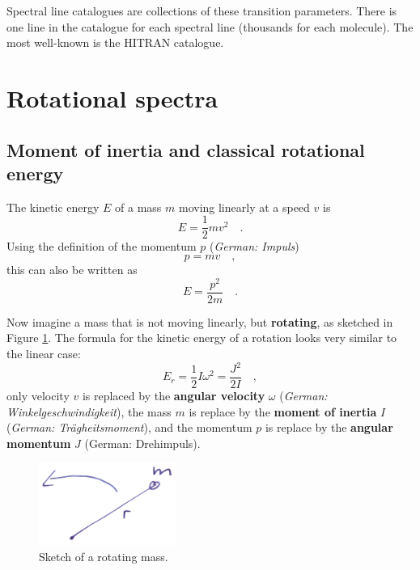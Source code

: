 Spectral line catalogues are collections of these transition parameters. There
is one line in the catalogue for each spectral line (thousands for each
molecule). The most well-known is the HITRAN catalogue.


\section{Rotational spectra}
\label{sec:rotational_spectra}

\subsection{Moment of inertia and classical rotational energy}

The kinetic energy $E$ of a mass $m$ moving linearly at a speed $v$ is
\begin{equation}
  E = \frac{1}{2} m v^2 \quad .
\end{equation}
Using the definition of the momentum $p$ (\emph{German: Impuls})
\begin{equation}
  p = m v \quad ,
\end{equation}
this can also be written as
\begin{equation}
  E = \frac{p^2}{2m} \quad .
\end{equation}

Now imagine a mass that is not moving linearly, but \textbf{rotating},
as sketched in Figure \ref{fig:rotating_mass}. The formula for the
kinetic energy of a rotation looks very similar to the linear case:
\begin{equation}
  \label{eq:rotational_energy}
  E_r = \frac{1}{2} I \omega^2 = \frac{J^2}{2I} \quad ,  
\end{equation}
only velocity $v$ is replaced by the \textbf{angular velocity}
$\omega$ (\emph{German: Winkelgeschwindigkeit}), the mass $m$ is
replace by the \textbf{moment of inertia} $I$ (\emph{German:
  Trägheitsmoment}), and the momentum $p$ is replace by the
\textbf{angular momentum} $J$ (German: Drehimpuls).

\begin{figure}
  \centering
  \includegraphics[width=0.4\textwidth]{figures/rotating_mass}
  \caption{Sketch of a rotating mass.}
  \label{fig:rotating_mass}
\end{figure}

